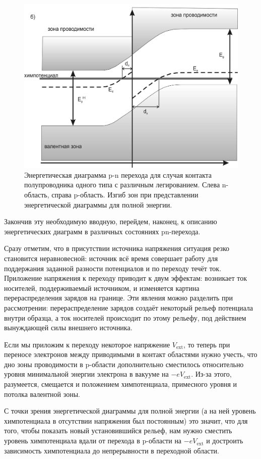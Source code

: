 \documentclass[a4paper, 12pt]{article}
\begin{document}
\begin{figure}[H]
	\centering
	\includegraphics[width=0.7\linewidth]{2_zones_cool}
	\caption{Энергетическая диаграмма p-n перехода для случая контакта полупроводника одного типа с различным легированием. Слева n-область, справа p-область. Изгиб зон при представлении энергетической диаграммы для полной энергии.}
	\label{fig:2_zones_cool}
\end{figure}

Закончив эту необходимую вводную, перейдем, наконец, к описанию энергетических диаграмм в различных состояниях pn-перехода.

Сразу отметим, что в присутствии источника напряжения ситуация резко становится неравновесной: источник всё время совершает работу для поддержания заданной разности потенциалов и по переходу течёт ток. Приложение напряжения к переходу приводит к двум эффектам: возникает ток носителей, поддерживаемый источником, и изменяется картина перераспределения зарядов на границе. Эти явления можно разделить при рассмотрении: перераспределение зарядов создаёт некоторый рельеф потенциала внутри образца, а ток носителей происходит по этому рельефу, под действием вынуждающей силы внешнего источника.

Если мы приложим к переходу некоторое напряжение $V_{\text{ext}}$, то теперь при переносе электронов между приводимыми в контакт областями нужно учесть, что дно зоны проводимости в p-области дополнительно сместилось относительно уровня минимальной энергии электрона в вакууме на $-eV_{\text{ext}}$. Из-за этого, разумеется, смещается и положением химпотенциала, примесного уровня и потолка валентной зоны.

С точки зрения энергетической диаграммы для полной энергии (а на ней уровень химпотенциала в отсутствии напряжения был постоянным) это значит, что для того, чтобы показать новый установившийся рельеф, нам нужно сместить уровень химпотенциала вдали от перехода в p-области на $-eV_{\text{ext}}$ и достроить зависимость химпотенциала до непрерывности в переходной области.
\end{document}
